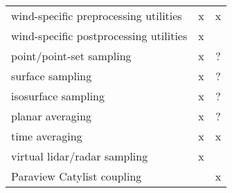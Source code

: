 \documentclass{article}
\begin{document}
\begin{center}
\begin{tabular}{ l | c | c }
\midrule
wind-specific preprocessing utilities & x & x \\
wind-specific postprocessing utilities & x &   \\
point/point-set sampling & x & ? \\
surface sampling & x & ? \\
isosurface sampling & x & ? \\
planar averaging & x & ? \\
time averaging & x & x \\
virtual lidar/radar sampling & x &   \\
Paraview Catylist coupling &   & x \\

\bottomrule
\end{tabular}
\end{center}


\end{document}
